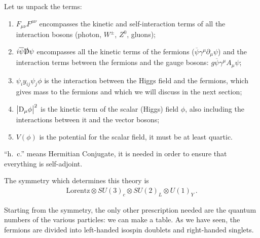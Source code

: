 \documentclass[main.tex]{subfiles}
\begin{document}
Let us unpack the terms: 
\begin{enumerate}
    \item \(F_{\mu \nu } F^{\mu \nu }\) encompasses the kinetic and self-interaction terms of all the interaction bosons (photon, \(W^{\pm}\), \(Z^{0}\), gluons);
    \item \(i \overline{\psi} \slashed{\mathrm{D}} \psi \) encompasses all the kinetic terms of the fermions (\(\overline{\psi} \gamma^{\mu } \partial_{\mu } \psi  \)) and the interaction terms between the fermions and the gauge bosons: \(g \overline{\psi} \gamma^{\mu }A_{\mu } \psi \);
    \item \(\psi_{i} y_{ij} \psi_{j} \phi \) is the interaction between the Higgs field and the fermions, which gives mass to the fermions and which we will discuss in the next section;
    \item \(\abs{\mathrm{D}_{\mu } \phi }^2\) is the kinetic term of the scalar (Higgs) field \(\phi \), also including the interactions between it and the vector bosons;
    \item \(V(\phi )\) is the potential for the scalar field, it must be at least quartic.  
\end{enumerate}

``h.\ c.'' means Hermitian Conjugate, it is needed in order to ensure that everything is self-adjoint. 

The symmetry which determines this theory is 
%
\begin{align}
\text{Lorentz} \otimes 
SU(3)_{c}  \otimes
SU(2)_{L} \otimes
U(1)_{Y}
\,.
\end{align}

Starting from the symmetry, the only other prescription needed are the quantum numbers of the various particles: we can make a table. 
As we have seen, the fermions are divided into left-handed isospin doublets and right-handed singlets. 
\end{document}
